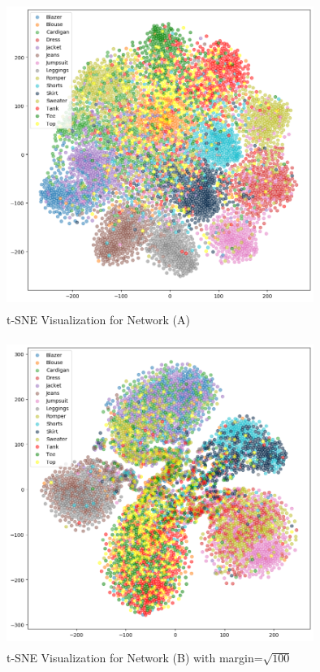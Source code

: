 \documentclass{article}
\begin{document}
\begin{figure}[H]
  \centering
    \includegraphics[width=10cm,height=10cm,keepaspectratio]{tSne_Plots/a_t-sne.png}
    \caption{t-SNE Visualization for Network (A)}
    \label{fig:fmnist}
\end{figure}

\begin{figure}[H]
  \centering
    \includegraphics[width=10cm,height=10cm,keepaspectratio]{tSne_Plots/c_100_t-sne.png}
    \caption{t-SNE Visualization for Network (B) with margin=$\sqrt{100}$}
    \label{fig:fmnist}
\end{figure}
\end{document}
